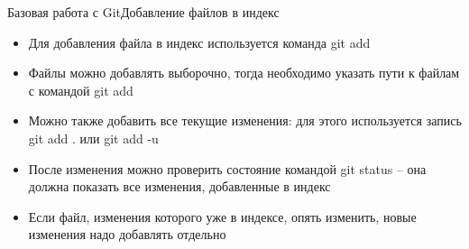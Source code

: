 \begin{frame}{Базовая работа с Git}{Добавление файлов в индекс}
    \begin{itemize}
        \item
              Для добавления файла в индекс используется команда git add
        \item
              Файлы можно добавлять выборочно, тогда необходимо указать пути к файлам с командой git add
        \item
              Можно также добавить все текущие изменения: для этого используется запись git add . или git add -u
        \item
              После изменения можно проверить состояние командой git status -- она должна показать все изменения, добавленные в индекс
        \item
              Если файл, изменения которого уже в индексе, опять изменить, новые изменения надо добавлять отдельно
    \end{itemize}
\end{frame}